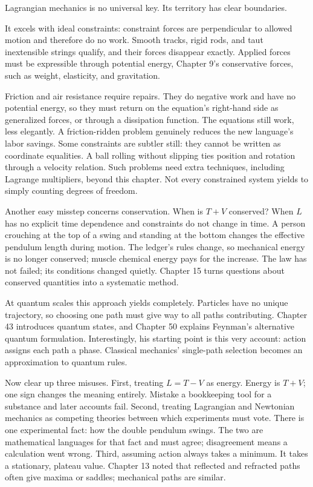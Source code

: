 \begin{mainline}
Lagrangian mechanics is no universal key. Its territory has clear boundaries.

It excels with ideal constraints: constraint forces are perpendicular to allowed motion and therefore do no work. Smooth tracks, rigid rods, and taut inextensible strings qualify, and their forces disappear exactly. Applied forces must be expressible through potential energy, Chapter 9's conservative forces, such as weight, elasticity, and gravitation.

Friction and air resistance require repairs. They do negative work and have no potential energy, so they must return on the equation's right-hand side as generalized forces, or through a dissipation function. The equations still work, less elegantly. A friction-ridden problem genuinely reduces the new language's labor savings. Some constraints are subtler still: they cannot be written as coordinate equalities. A ball rolling without slipping ties position and rotation through a velocity relation. Such problems need extra techniques, including Lagrange multipliers, beyond this chapter. Not every constrained system yields to simply counting degrees of freedom.

Another easy misstep concerns conservation. When is \(T+V\) conserved? When \(L\) has no explicit time dependence and constraints do not change in time. A person crouching at the top of a swing and standing at the bottom changes the effective pendulum length during motion. The ledger's rules change, so mechanical energy is no longer conserved; muscle chemical energy pays for the increase. The law has not failed; its conditions changed quietly. Chapter 15 turns questions about conserved quantities into a systematic method.

At quantum scales this approach yields completely. Particles have no unique trajectory, so choosing one path must give way to all paths contributing. Chapter 43 introduces quantum states, and Chapter 50 explains Feynman's alternative quantum formulation. Interestingly, his starting point is this very account: action assigns each path a phase. Classical mechanics' single-path selection becomes an approximation to quantum rules.

Now clear up three misuses. First, treating \(L=T-V\) as energy. Energy is \(T+V\); one sign changes the meaning entirely. Mistake a bookkeeping tool for a substance and later accounts fail. Second, treating Lagrangian and Newtonian mechanics as competing theories between which experiments must vote. There is one experimental fact: how the double pendulum swings. The two are mathematical languages for that fact and must agree; disagreement means a calculation went wrong. Third, assuming action always takes a minimum. It takes a stationary, plateau value. Chapter 13 noted that reflected and refracted paths often give maxima or saddles; mechanical paths are similar.


\end{mainline}
